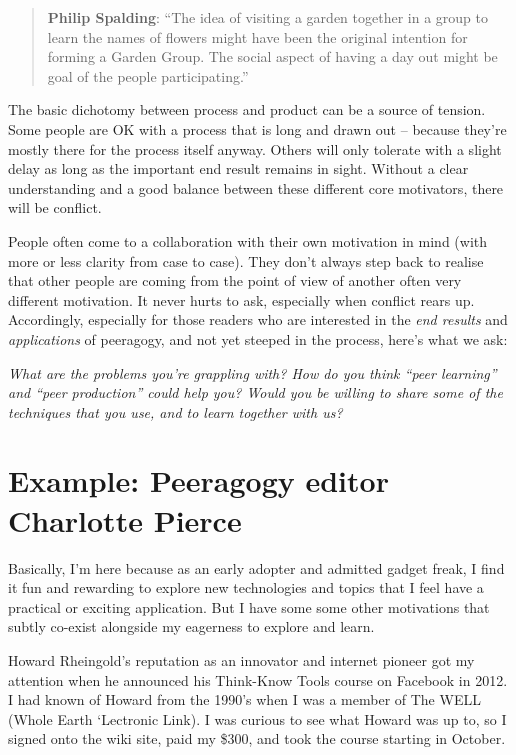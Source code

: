 \begin{quote}
\textbf{Philip Spalding}: ``The idea of visiting a garden together in a
group to learn the names of flowers might have been the original
intention for forming a Garden Group. The social aspect of having a day
out might be goal of the people participating.''
\end{quote}

The basic dichotomy between process and product can be a source of
tension. Some people are OK with a process that is long and drawn out --
because they're mostly there for the process itself anyway. Others will
only tolerate with a slight delay as long as the important end result
remains in sight. Without a clear understanding and a good balance
between these different core motivators, there will be conflict.

People often come to a collaboration with their own motivation in mind
(with more or less clarity from case to case). They don't always step
back to realise that other people are coming from the point of view of
another often very different motivation. It never hurts to ask,
especially when conflict rears up. Accordingly, especially for those
readers who are interested in the \emph{end results} and
\emph{applications} of peeragogy, and not yet steeped in the process,
here's what we ask:

\emph{What are the problems you're grappling with? How do you think
``peer learning'' and ``peer production'' could help you? Would you be
willing to share some of the techniques that you use, and to learn
together with us?}

\section*{Example: Peeragogy editor Charlotte
Pierce}\label{example-peeragogy-editor-charlotte-pierce}

Basically, I'm here because as an early adopter and admitted gadget
freak, I find it fun and rewarding to explore new technologies and
topics that I feel have a practical or exciting application. But I have
some some other motivations that subtly co-exist alongside my eagerness
to explore and learn.

Howard Rheingold's reputation as an innovator and internet pioneer got
my attention when he announced his Think-Know Tools course on Facebook
in 2012. I had known of Howard from the 1990's when I was a member of
The WELL (Whole Earth `Lectronic Link). I was curious to see what Howard
was up to, so I signed onto the wiki site, paid my \$300, and took the
course starting in October.

